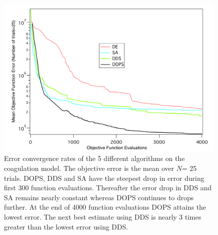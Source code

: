 \documentclass[12pt]{article}
\begin{document}
\begin{figure}[h]
\centering
\includegraphics[width=1.0\textwidth,height=0.5\textheight]{./figs/Figure_3_Errors_convergence.pdf}
\caption{Error convergence rates of the 5 different algorithms on the coagulation model. The objective error is the mean over $N$= 25 trials. DOPS, DDS and SA have the steepest drop in error during first 300 function evaluations. Thereafter the error drop in DDS and SA remains nearly constant whereas DOPS continues to drops further. At the end of 4000 function evaluations DOPS attains the lowest error. The next best estimate using DDS is nearly 3 times greater than the lowest error using DDS.
}\label{fig-convergence}
\end{figure}

\clearpage
\end{document}

